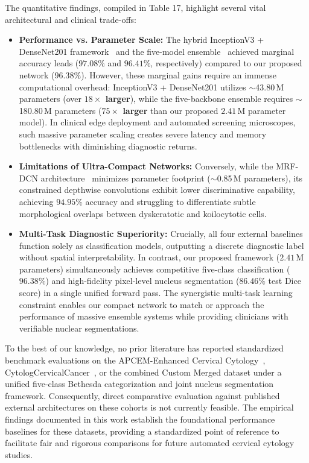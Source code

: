 \documentclass[pdflatex,sn-nature]{sn-jnl}%
\theoremstyle{thmstyleone}%
\theoremstyle{thmstyletwo}%
\theoremstyle{thmstylethree}%
\begin{document}
The quantitative findings, compiled in Table 17, highlight several vital architectural and clinical trade-offs:
\begin{itemize}
    \item \textbf{Performance vs. Parameter Scale:} The hybrid InceptionV3 + DenseNet201 framework~\cite{sharma2025enhancing} and the five-model ensemble~\cite{Verma2025} achieved marginal accuracy leads ($97.08\%$ and $96.41\%$, respectively) compared to our proposed network ($96.38\%$). However, these marginal gains require an immense computational overhead: InceptionV3 + DenseNet201 utilizes $\sim$43.80\,M parameters (over \textbf{$18\times$ larger}), while the five-backbone ensemble requires $\sim$180.80\,M parameters (\textbf{$75\times$ larger} than our proposed $2.41$\,M parameter model). In clinical edge deployment and automated screening microscopes, such massive parameter scaling creates severe latency and memory bottlenecks with diminishing diagnostic returns.
    \item \textbf{Limitations of Ultra-Compact Networks:} Conversely, while the MRF-DCN architecture~\cite{shaik2025deeplearningenabledsegmentation} minimizes parameter footprint ($\sim$0.85\,M parameters), its constrained depthwise convolutions exhibit lower discriminative capability, achieving $94.95\%$ accuracy and struggling to differentiate subtle morphological overlaps between dyskeratotic and koilocytotic cells.
    \item \textbf{Multi-Task Diagnostic Superiority:} Crucially, all four external baselines~\cite{sharma2025diagnosis, sharma2025enhancing, Verma2025, shaik2025deeplearningenabledsegmentation} function solely as classification models, outputting a discrete diagnostic label without spatial interpretability. In contrast, our proposed framework ($2.41$\,M parameters) simultaneously achieves competitive five-class classification ($96.38\%$) and high-fidelity pixel-level nucleus segmentation ($86.46\%$ test Dice score) in a single unified forward pass. The synergistic multi-task learning constraint enables our compact network to match or approach the performance of massive ensemble systems while providing clinicians with verifiable nuclear segmentations.
\end{itemize}

To the best of our knowledge, no prior literature has reported standardized benchmark evaluations on the APCEM-Enhanced Cervical Cytology~\cite{aswini2026apcem}, CytologCervicalCancer~\cite{jnx03_2025}, or the combined Custom Merged dataset under a unified five-class Bethesda categorization and joint nucleus segmentation framework. Consequently, direct comparative evaluation against published external architectures on these cohorts is not currently feasible. The empirical findings documented in this work establish the foundational performance baselines for these datasets, providing a standardized point of reference to facilitate fair and rigorous comparisons for future automated cervical cytology studies.
\end{document}
